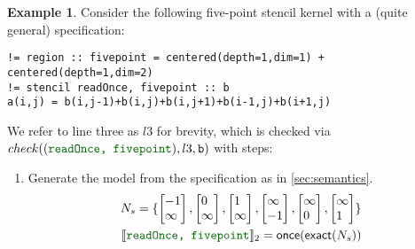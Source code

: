 \documentclass[10pt,preprint,numbers]{sigplanconf}
\newcounter{block}
\theoremstyle{definition}
\newtheorem{example}[block]{Example}
\newcommand{\interp}[1]{\llbracket{#1}\rrbracket}
\newcommand{\vtwo}[2]{\setlength{\arraycolsep}{0em}
\left[\begin{array}{l}#1\\#2\end{array}\right]}
\begin{document}
\begin{example}
  Consider the following five-point stencil kernel with a (quite general) specification:
%
\begin{verbatim}
!= region :: fivepoint = centered(depth=1,dim=1) + centered(depth=1,dim=2)
!= stencil readOnce, fivepoint :: b
a(i,j) = b(i,j-1)+b(i,j)+b(i,j+1)+b(i-1,j)+b(i+1,j)
\end{verbatim}
%
We refer to line three as $l3$ for brevity,
which is checked via
$check(({\textcolor{darkgreen}{\texttt{readOnce, fivepoint}}}),l3,\texttt{b})$
with steps:
\begin{enumerate}
%
\item Generate the model from the specification as in
  \cref{sec:semantics}.
%
\vspace{-0.4em}
\begin{align*}
 N_s= \{  \vtwo{-1}{\infty},
          \vtwo{0}{\infty},
          \vtwo{1}{\infty},
          \vtwo{\infty}{-1},
          \vtwo{\infty}{0},
        \vtwo{\infty}{1} \}  \\
\interp{{\textcolor{darkgreen}{\texttt{readOnce, fivepoint}}}}_2 =
  \textsf{once}(\textsf{exact} (N_s))
\end{align*}
\vspace{-1.5em}


\end{enumerate}
\end{example}
\end{document}
